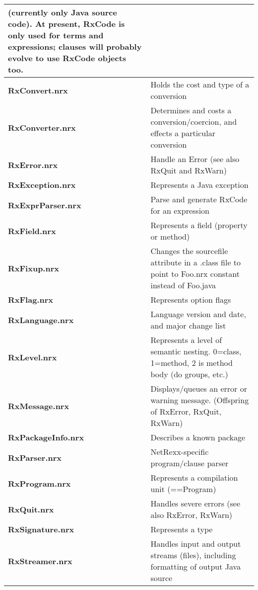 {\begin{table}
\begin{tabularx}{\textwidth}{>{\bfseries}lX}
                         (currently only Java source code).
                         At present, RxCode is only used for terms and
                         expressions; clauses will probably evolve to
                         use RxCode objects too.
\\\midrule
  RxConvert.nrx       & Holds the cost and type of a conversion
\\\midrule
  RxConverter.nrx     & Determines and costs a conversion/coercion, and
                         effects a particular conversion
\\\midrule
  RxError.nrx         & Handle an Error (see also RxQuit and RxWarn)
\\\midrule
  RxException.nrx     & Represents a Java exception
\\\midrule
  RxExprParser.nrx    & Parse and generate RxCode for an expression
\\\midrule
  RxField.nrx         & Represents a field (property or method)
\\\midrule
  RxFixup.nrx         & Changes the sourcefile attribute in a .class
                         file to point to Foo.nrx constant instead of
                         Foo.java
\\\midrule
  RxFlag.nrx          & Represents option flags
\\\midrule
  RxLanguage.nrx      & Language version and date, and major change
                         list
\\\midrule
  RxLevel.nrx         & Represents a level of semantic nesting.
                         0=class, 1=method, 2  is method body (do
                         groups, etc.)
\\\midrule
  RxMessage.nrx       & Displays/queues an error or warning message.
                         (Offspring of RxError, RxQuit, RxWarn)
\\\midrule
  RxPackageInfo.nrx   & Describes a known package
\\\midrule
  RxParser.nrx        & NetRexx-specific program/clause parser
\\\midrule
  RxProgram.nrx       & Represents a compilation unit (==Program)
\\\midrule
  RxQuit.nrx          & Handles severe errors (see also RxError,
  RxWarn)
\\\midrule
  RxSignature.nrx     & Represents a type
\\\midrule
  RxStreamer.nrx      & Handles input and output streams (files),
                         including formatting of output Java source

\end{tabularx}
\end{table}}
